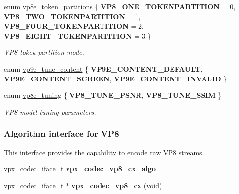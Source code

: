 \begin{DoxyCompactItemize}
enum \hyperlink{group__vp8__encoder_ga5f7508ba3fb453b47f62313ed0b864d2}{vp8e\+\_\+token\+\_\+partitions} \{ {\bfseries V\+P8\+\_\+\+O\+N\+E\+\_\+\+T\+O\+K\+E\+N\+P\+A\+R\+T\+I\+T\+I\+ON} = 0, 
{\bfseries V\+P8\+\_\+\+T\+W\+O\+\_\+\+T\+O\+K\+E\+N\+P\+A\+R\+T\+I\+T\+I\+ON} = 1, 
{\bfseries V\+P8\+\_\+\+F\+O\+U\+R\+\_\+\+T\+O\+K\+E\+N\+P\+A\+R\+T\+I\+T\+I\+ON} = 2, 
{\bfseries V\+P8\+\_\+\+E\+I\+G\+H\+T\+\_\+\+T\+O\+K\+E\+N\+P\+A\+R\+T\+I\+T\+I\+ON} = 3
 \}\begin{DoxyCompactList}\small\item\em V\+P8 token partition mode. \end{DoxyCompactList}
\item 
enum \hyperlink{group__vp8__encoder_ga76d4298d5ee58718597f307a290211a9}{vp9e\+\_\+tune\+\_\+content} \{ {\bfseries V\+P9\+E\+\_\+\+C\+O\+N\+T\+E\+N\+T\+\_\+\+D\+E\+F\+A\+U\+LT}, 
{\bfseries V\+P9\+E\+\_\+\+C\+O\+N\+T\+E\+N\+T\+\_\+\+S\+C\+R\+E\+EN}, 
{\bfseries V\+P9\+E\+\_\+\+C\+O\+N\+T\+E\+N\+T\+\_\+\+I\+N\+V\+A\+L\+ID}
 \}
\item 
enum \hyperlink{group__vp8__encoder_ga371dbc29054b3d46364af996ad42ab94}{vp8e\+\_\+tuning} \{ {\bfseries V\+P8\+\_\+\+T\+U\+N\+E\+\_\+\+P\+S\+NR}, 
{\bfseries V\+P8\+\_\+\+T\+U\+N\+E\+\_\+\+S\+S\+IM}
 \}\begin{DoxyCompactList}\small\item\em V\+P8 model tuning parameters. \end{DoxyCompactList}
\end{DoxyCompactItemize}
\subsubsection*{Algorithm interface for V\+P8}
\label{_amgrp0b829b38ff2e659173b35cd78e0735bd}%
This interface provides the capability to encode raw V\+P8 streams. \begin{DoxyCompactItemize}
\item 
\hyperlink{group__codec_gae99c3b04f4a567a311211cce3ae6b83b}{vpx\+\_\+codec\+\_\+iface\+\_\+t} {\bfseries vpx\+\_\+codec\+\_\+vp8\+\_\+cx\+\_\+algo}\hypertarget{group__vp8__encoder_ga689ede372ab835c8e1c9631f17b47eb5}{}\label{group__vp8__encoder_ga689ede372ab835c8e1c9631f17b47eb5}

\item 
\hyperlink{group__codec_gae99c3b04f4a567a311211cce3ae6b83b}{vpx\+\_\+codec\+\_\+iface\+\_\+t} $\ast$ {\bfseries vpx\+\_\+codec\+\_\+vp8\+\_\+cx} (void)\hypertarget{group__vp8__encoder_ga1b5362d0d5b5a2d50f173f9c160fad9f}{}\label{group__vp8__encoder_ga1b5362d0d5b5a2d50f173f9c160fad9f}

\end{DoxyCompactItemize}
